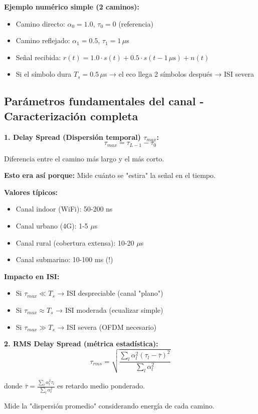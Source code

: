 \documentclass[10pt,a4paper]{article}
\begin{document}
\textbf{Ejemplo numérico simple (2 caminos):}
\begin{itemize}
\item Camino directo: $\alpha_0 = 1.0$, $\tau_0 = 0$ (referencia)
\item Camino reflejado: $\alpha_1 = 0.5$, $\tau_1 = 1\,\mu$s
\item Señal recibida: $r(t) = 1.0 \cdot s(t) + 0.5 \cdot s(t - 1\,\mu\text{s}) + n(t)$
\item Si el símbolo dura $T_s = 0.5\,\mu$s → el eco llega 2 símbolos después → ISI severa
\end{itemize}

\subsection{Parámetros fundamentales del canal - Caracterización completa}

\begin{tcolorbox}[colback=azulclaro!10,colframe=azuloscuro,title=📏 Parámetros en Dominio TEMPORAL]
\textbf{1. Delay Spread (Dispersión temporal) $\tau_{max}$:}
$$\boxed{\tau_{max} = \tau_{L-1} - \tau_0}$$

Diferencia entre el camino más largo y el más corto.

\textbf{Esto era así porque:} Mide cuánto se "estira" la señal en el tiempo.

\textbf{Valores típicos:}
\begin{itemize}
\item Canal indoor (WiFi): 50-200 ns
\item Canal urbano (4G): 1-5 $\mu$s
\item Canal rural (cobertura extensa): 10-20 $\mu$s
\item Canal submarino: 10-100 ms (!)
\end{itemize}

\textbf{Impacto en ISI:}
\begin{itemize}
\item Si $\tau_{max} \ll T_s$ → ISI despreciable (canal "plano")
\item Si $\tau_{max} \approx T_s$ → ISI moderada (ecualizar simple)
\item Si $\tau_{max} \gg T_s$ → ISI severa (OFDM necesario)
\end{itemize}

\textbf{2. RMS Delay Spread (métrica estadística):}
$$\tau_{rms} = \sqrt{\frac{\sum_l \alpha_l^2 (\tau_l - \bar{\tau})^2}{\sum_l \alpha_l^2}}$$

donde $\bar{\tau} = \frac{\sum_l \alpha_l^2 \tau_l}{\sum_l \alpha_l^2}$ es retardo medio ponderado.

Mide la "dispersión promedio" considerando energía de cada camino.
\end{tcolorbox}
\end{document}
